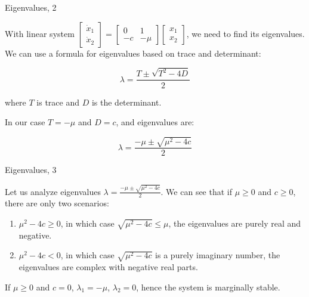 \documentclass{beamer}
\begin{document}
\begin{frame}{Eigenvalues, 2}
	\begin{flushleft}
		
		With linear system 
		$
		\begin{bmatrix}
			\dot x_1 \\ \dot x_2
		\end{bmatrix}
		=
		\begin{bmatrix}
			0 & 1 \\
			-c & -\mu
		\end{bmatrix} 
		\begin{bmatrix}
			x_1 \\ x_2
		\end{bmatrix}   
		$, we need to find its eigenvalues. We can use a formula for eigenvalues based on trace and determinant:
		
		\begin{equation}
			\lambda = \frac{T \pm \sqrt{T^2 - 4D} }{2}
		\end{equation}
		
		where $T$ is trace and $D$ is the determinant.
		
		\bigskip
		
		In our case $T = -\mu$ and $D = c$, and eigenvalues are:
		
		\begin{equation}
			\lambda = \frac{-\mu \pm \sqrt{\mu^2 - 4c} }{2}
		\end{equation}
		
		
	\end{flushleft}
\end{frame}



\begin{frame}{Eigenvalues, 3}
	\begin{flushleft}
		
		Let us analyze eigenvalues $\lambda = \frac{-\mu \pm \sqrt{\mu^2 - 4c} }{2}$. We can see that if $\mu \geq 0$ and $c \geq 0$, there are only two scenarios: 
		
		\begin{enumerate}
			\item $\mu^2 - 4c \geq 0$, in which case $\sqrt{\mu^2 - 4c} \leq \mu$, the eigenvalues are purely real and negative.
			\item $\mu^2 - 4c < 0$, in which case $\sqrt{\mu^2 - 4c}$ is a purely imaginary number, the eigenvalues are complex with negative real parts.
		\end{enumerate}
		
		If $\mu \geq 0$ and $c = 0$, $\lambda_1 = -\mu$, $\lambda_2 = 0$, hence the system is marginally stable.
		
	\end{flushleft}
\end{frame}
\end{document}
